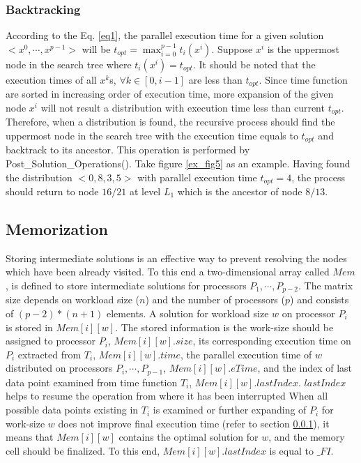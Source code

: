\documentclass[12pt]{article}
\begin{document}
\subsubsection{Backtracking}	\label{sec_backtracking}
According to the Eq. \ref{eq1}, the parallel execution time for a given solution $<x^0,\cdots,x^{p-1}>$ will be $t_{opt}=\max_{i=0}^{p-1}t_i(x^i)$. Suppose $x^i$ is the uppermost node in the search tree where $t_i(x^i)=t_{opt}$. It should be noted that the execution times of all $x^k$s, $\forall k \in [0,i-1]$ are less than $t_{opt}$. Since time function are sorted in increasing order of execution time, more expansion of the given node $x^i$ will not result a distribution with execution time less than current $t_{opt}$. Therefore, when a distribution is found, the recursive process should find the uppermost node in the search tree with the execution time equals to $t_{opt}$ and backtrack to its ancestor. This operation is performed by Post\_Solution\_Operations(). Take figure \ref{ex_fig5} as an example. Having found the distribution $<0,8,3,5>$ with parallel execution time $t_{opt}=4$, the process should return to node $16/21$ at level $L_1$ which is the ancestor of node $8/13$.

\subsection{Memorization}	\label{sec_mem}
Storing intermediate solutions is an effective way to prevent resolving the nodes which have been already visited. To this end a two-dimensional array called $Mem$, is defined to store intermediate solutions for processors $P_1,\cdots,P_{p - 2}$. The matrix size depends on workload size ($n$) and the number of processors ($p$) and consists of $(p-2) * (n+1)$ elements. A solution for workload size $w$ on processor $P_i$ is stored in $Mem[i][w]$. The stored information is the work-size should be assigned to processor $P_i$, $Mem[i][w].size$, its corresponding execution time on $P_i$ extracted from $T_i$, $Mem[i][w].time$, the parallel execution time of $w$ distributed on processors $P_i,\cdots,P_{p-1}$, $Mem[i][w].eTime$, and the index of last data point examined from time function $T_i$, $Mem[i][w].lastIndex$. $lastIndex$ helps to resume the operation from where it has been interrupted When all possible data points existing in $T_i$ is examined or further expanding of $P_i$ for work-size $w$ does not improve final execution time (refer to section \ref{sec_backtracking}), it means that $Mem[i][w]$ contains the optimal solution for $w$, and the memory cell should be finalized. To this end, $Mem[i][w].lastIndex$ is equal to $\_FI$.
\end{document}

